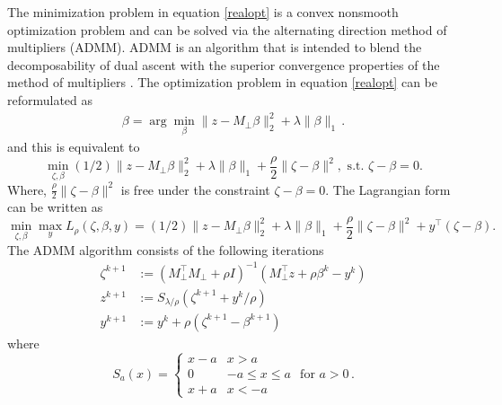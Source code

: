 \documentclass[final,onefignum,onetabnum]{siamart190516}
\begin{document}
The  minimization problem in equation \eqref{realopt} is a convex nonsmooth optimization problem and can be solved via the alternating direction method of multipliers (ADMM). ADMM is an algorithm that is intended to blend the decomposability of dual ascent with the superior convergence properties of the method of multipliers \cite{boyd2011distributed}. The optimization problem in equation \eqref{realopt} can be reformulated as 
\begin{align}
\beta = \arg\min_{\beta}\|z-M_{\perp}\beta\|^2_2 + \lambda \|\beta\|_1 \,.
\end{align}
and this is equivalent to
\begin{equation}
    \min_{\zeta, \beta}(1 / 2)\|z - M_{\perp}\beta \|_{2}^{2}+\lambda\|\beta\|_{1} + \frac{\rho}{2}\|\zeta-\beta\|^2,\text{ s.t. }\zeta - \beta = 0.
\end{equation}
Where, $ \displaystyle \frac{\rho}{2}\|\zeta-\beta \|^2$ is free under the constraint $\zeta - \beta = 0$. The Lagrangian form can be written as
\begin{equation}
    \min_{\zeta,\beta}\max_{y} L_{\rho}(\zeta,\beta,y) = (1 / 2)\|z - M_{\perp}\beta \|_{2}^{2}+\lambda\|\beta\|_{1} + \frac{\rho}{2}\|\zeta-\beta\|^2 + y^{\top}(\zeta-\beta).
\end{equation}
The ADMM algorithm consists of the following iterations
\begin{equation}\label{eqn:ADMM_Update}
    \begin{aligned}
\zeta^{k+1} &:=\left(M_{\perp}^{\top} M_{\perp} +\rho I\right)^{-1}\left(M_{\perp}^{\top} z+\rho \beta^{k}-y^{k}\right) \\
z^{k+1} &:=S_{\lambda / \rho}\left(\zeta^{k+1}+y^{k} / \rho\right) \\
y^{k+1} &:=y^{k}+\rho\left(\zeta^{k+1}-\beta^{k+1}\right)
\end{aligned}
\end{equation}
where 
\begin{equation}
S_{a}(x) = \begin{cases}x-a & x > a \\ 0 & -a\leq x\leq a\\ x+a & x<-a\end{cases}   \text{ for }a>0\,.
\end{equation}
\end{document}
